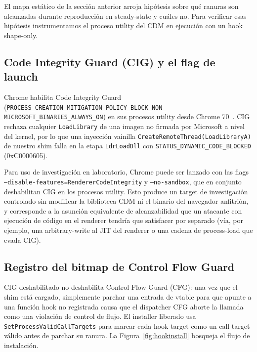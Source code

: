 \documentclass[11pt,letterpaper]{article}
\begin{document}
El mapa estático de la sección anterior arroja hipótesis sobre
qué ranuras son alcanzadas durante reproducción en steady-state y
cuáles no. Para verificar esas hipótesis instrumentamos el
proceso utility del CDM en ejecución con un hook shape-only.

\subsection{Code Integrity Guard (CIG) y el flag de launch}
\label{sec:runtime-cig}

Chrome habilita Code Integrity Guard
(\texttt{PROCESS\_CREATION\_MITIGATION\_POLICY\_BLOCK\_NON\_\\MICROSOFT\_BINARIES\_ALWAYS\_ON})
en sus procesos utility desde Chrome 70~\cite{chromium-cig}. CIG
rechaza cualquier \texttt{LoadLibrary} de una imagen no firmada
por Microsoft a nivel del kernel, por lo que una inyección
vainilla \texttt{CreateRemoteThread(LoadLibraryA)} de nuestro
shim falla en la etapa \texttt{LdrLoadDll} con
\texttt{STATUS\_DYNAMIC\_CODE\_BLOCKED} (0xC0000605).

Para uso de investigación en laboratorio, Chrome puede ser
lanzado con las flags
\texttt{--disable-features=}\linebreak[1]\texttt{RendererCodeIntegrity}
y \texttt{--no-sandbox}, que en conjunto deshabilitan CIG en los
procesos utility. Esto produce un target de investigación
controlado sin modificar la biblioteca CDM ni el binario del
navegador anfitrión, y corresponde a la asunción equivalente de
alcanzabilidad que un atacante con ejecución de código en el
renderer tendría que satisfacer por separado (vía, por ejemplo,
una arbitrary-write al JIT del renderer o una cadena de
process-load que evada CIG).

\subsection{Registro del bitmap de Control Flow Guard}
\label{sec:runtime-cfg}

CIG-deshabilitado no deshabilita Control Flow Guard (CFG): una
vez que el shim está cargado, simplemente parchar una entrada de
vtable para que apunte a una función hook no registrada causa
que el dispatcher CFG aborte la llamada como una violación de
control de flujo. El installer liberado usa
\texttt{SetProcessValidCallTargets} para marcar cada hook target
como un call target válido antes de parchar su ranura. La
Figura~\ref{fig:hookinstall} bosqueja el flujo de instalación.
\end{document}
